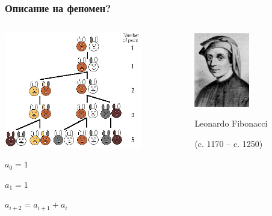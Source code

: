 \documentclass{beamer}
\begin{document}
\begin{frame}[fragile]
\frametitle{Описание на феномен?}
\begin{columns}[t]
  \begin{column}{0.6\textwidth}
    \includegraphics[width=6cm]{images/fib_rabbits}

$a_0=1$


$a_1=1$


$a_{i+2} = a_{i+1} + a_i $
  \end{column}
  \begin{column}{0.4\textwidth}
\vspace*{-150px}

   \begin{center}
   \includegraphics[width=2.4cm]{images/Fibonacci}

     Leonardo Fibonacci

     (c. 1170 – c. 1250)
   \end{center}
  \end{column}
\end{columns}




\end{frame}
\end{document}
